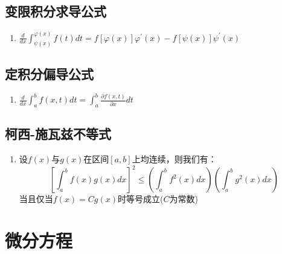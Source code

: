 \documentclass[12pt,a4paper,UTF8]{book}
\begin{document}
\subsection{变限积分求导公式}
\begin{enumerate}
\item $\frac{d}{dx}\int_{\psi\left(x\right)}^{\varphi\left(x\right)}f\left(t\right)dt=f\left[\varphi\left(x\right)\right]\varphi^\prime\left(x\right)-f\left[\psi\left(x\right)\right]\psi^\prime\left(x\right)$
\end{enumerate}

\subsection{定积分偏导公式}
\begin{enumerate}
\item $\frac{d}{dx}\int_{a}^{b}f\left(x,t\right)dt=\int_{a}^{b}\frac{\partial f\left(x,t\right)}{\partial x}dt$
\end{enumerate}

\subsection{柯西-施瓦兹不等式}
\begin{enumerate}
\item 设$f\left(x\right)$与$g\left(x\right)$在区间$\left[a,b\right]$上均连续，则我们有：
\[\left[\int_{a}^{b}f\left(x\right)g\left(x\right)dx\right]^2\le\left(\int_{a}^{b}f^2\left(x\right)dx\right)\left(\int_{a}^{b}g^2\left(x\right)dx\right)\]
当且仅当$f\left(x\right)=Cg\left(x\right)$时等号成立($C$为常数)
\end{enumerate}


\section{微分方程}
\end{document}
